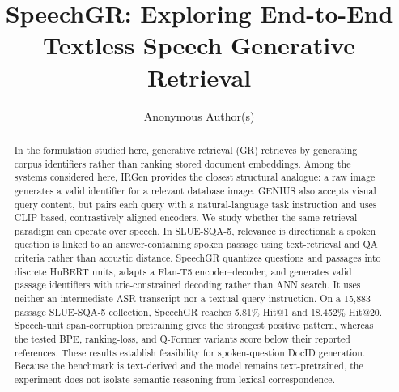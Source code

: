 \documentclass{article}
\title{SpeechGR: Exploring End-to-End Textless Speech Generative Retrieval}
\author{Anonymous Author(s)}
\begin{document}
\maketitle

\begin{abstract}
In the formulation studied here, generative retrieval (GR) retrieves by
generating corpus identifiers rather than ranking stored document embeddings.
Among the systems considered here, IRGen provides the closest structural
analogue: a raw image generates a valid identifier for a relevant database
image. GENIUS also accepts visual query content, but pairs each query with a
natural-language task instruction and uses CLIP-based, contrastively aligned
encoders. We study whether the same retrieval paradigm can operate over speech.
In SLUE-SQA-5, relevance is directional: a spoken question is linked to
an answer-containing spoken passage using text-retrieval and QA criteria rather
than acoustic distance. SpeechGR quantizes questions
and passages into discrete HuBERT units, adapts a Flan-T5 encoder--decoder, and
generates valid passage identifiers with trie-constrained decoding rather than
ANN search. It uses neither an intermediate ASR transcript nor a textual query
instruction. On a 15,883-passage SLUE-SQA-5 collection, SpeechGR reaches
5.81\% Hit@1 and 18.452\% Hit@20. Speech-unit span-corruption pretraining gives
the strongest positive pattern, whereas the tested BPE, ranking-loss, and
Q-Former variants score below their reported references. These results
establish feasibility for spoken-question DocID generation. Because the
benchmark is text-derived and the model remains text-pretrained, the experiment
does not isolate semantic reasoning from lexical correspondence.
\end{abstract}



\PaperIntroduction
\PaperRelatedWork




\PaperLimitations
\PaperConclusion



\end{document}
